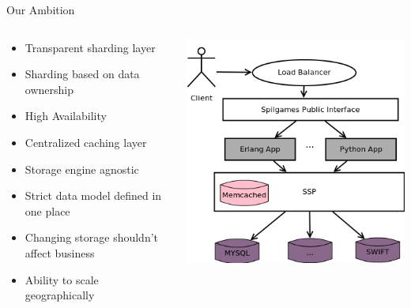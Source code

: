 \documentclass[aspectratio=169]{beamer}
\begin{document}
\begin{frame}{Our Ambition}
    \begin{columns}
        \begin{column}[c]{0.65\textwidth}
            \begin{itemize}
                \item Transparent sharding layer
                \item Sharding based on data ownership
                \item High Availability
                \item Centralized caching layer
                \item Storage engine agnostic
                \item Strict data model defined in one place
                \item Changing storage shouldn't affect business
                \item Ability to scale geographically
            \end{itemize}
        \end{column}
        \begin{column}[c]{0.35\textwidth}
            \includegraphics[width=\textwidth]{images/newstorageusage.png}
        \end{column}
    \end{columns}
\end{frame}
\end{document}
